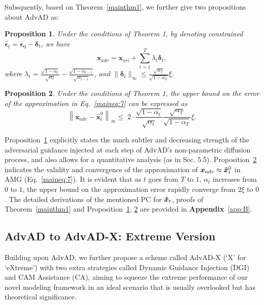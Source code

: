 \documentclass{article}
\newtheorem{proposition}{Proposition}
\begin{document}
Subsquently, based on Theorem~\ref{mainthm1}, we further give two propositions about AdvAD as:
\begin{proposition}
\label{mainprop1}
Under the conditions of Theorem 1, by denoting constrained $\boldsymbol{\hat{\epsilon}}_t = \boldsymbol{\epsilon}_0 - \boldsymbol{\delta}_t$, we have
    \begin{equation}\tag{12}
    \boldsymbol{x}_{adv}=\boldsymbol{x}_{ori}+\sum_{t=1}^{T}\lambda_{t}\boldsymbol{\delta}_t,
    \label{maineq:12}
    \end{equation}
    where $\lambda_{t} = \frac{\sqrt{1-\alpha_t}}{\sqrt{\alpha_t}} - \frac{\sqrt{1-{\alpha_{t-1}}}}{\sqrt{\alpha_{t-1}}}$, and $\|\boldsymbol{\delta}_t\|_{\infty} \leq \frac{\sqrt{\alpha_T}}{\sqrt{1-\alpha_T}}\xi$.
\end{proposition}
\begin{proposition}
\label{mainprop2}
Under the conditions of Theorem 1, the upper bound on the error of the approximation in Eq.~\eqref{maineq:7} can be expressed as
    \begin{equation}\tag{13}
        \left\|\boldsymbol{x}_{adv} - \boldsymbol{\hat{x}}_{t}^{0}\right\|_\infty \leq \;2 \cdot \frac{\sqrt{1 - \alpha_t}}{\sqrt{\alpha_t}}\frac{\sqrt{\alpha_T}}{\sqrt{1 - \alpha_T}}\xi.
    \label{maineq:13}
    \end{equation}
\end{proposition}
Proposition~\ref{mainprop1} explicitly states the much subtler and decreasing strength of the adversarial guidance injected at each step of AdvAD's non-parametric diffusion process, and also allows for a quantitative analysis (as in Sec. 5.5). 
Proposition~\ref{mainprop2} indicates the validity and convergence of the approximation of $\boldsymbol{x}_{adv} \approx \boldsymbol{\Hat{x}}_t^0$ in AMG (Eq.~\eqref{maineq:7}). It is evident that as $t$ goes from $T$ to $1$, $\alpha_t$ increases from $0$ to $1$, the upper bound on the approximation error rapidly converge from $2\xi$ to $0$. 
The detailed derivations of the mentioned PC for $\boldsymbol{\Hat{x}}_t$, proofs of  Theorem~\ref{mainthm1} and Proposition~\ref{mainprop1}, \ref{mainprop2} are provided in \textbf{Appendix}~\ref{app:B}.



\subsection{AdvAD to AdvAD-X: Extreme Version}
\label{sec:3.4}

Building upon AdvAD, we further propose a scheme called AdvAD-X (`X' for `eXtreme') with two extra strategies called Dynamic Guidance Injection (DGI) and CAM Assistance (CA), aiming to squeeze the extreme performance of our novel modeling framework in an ideal scenario that is usually overlooked but has theoretical significance. 
\end{document}
